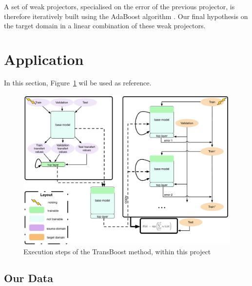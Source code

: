 \documentclass[11 pt]{article}
\begin{document}
A set of weak projectors, specialised on the error of the previous projector, is therefore iteratively built using the AdaBoost algorithm \cite{boosting}. Our final hypothesis on the target domain in a linear combination of these weak projectors.

\section{Application}

In this section, Figure~\ref{figRes} wil be used as reference.

\begin{figure}[H]
  \includegraphics[width=\textwidth]{fig1.pdf}
  \caption{Execution steps of the TransBoost method, within this project}
  \label{figRes}
\end{figure}

\subsection{Our Data}
\end{document}
